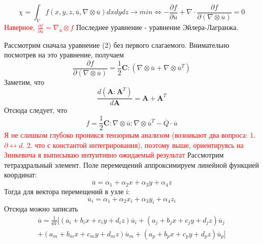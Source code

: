 \documentclass[a4paper,12pt]{article}
\begin{document}
\begin{equation}
\chi = \int_V f(x,y,z,\overline{u}, \nabla \otimes \overline{u})dxdydz  \rightarrow min \Longleftrightarrow -\frac{\partial f}{\partial \overline{u}} + \nabla \cdot \frac{\partial f}{\partial (\nabla \otimes \overline{u} )} = 0
\end{equation}
\textcolor{red}{ Наверное, $\frac{\partial f}{\partial \overline{u}} = \nabla_{\overline{u}} \otimes f$}
Последнее уравнение - уравнение Эйлера-Лагранжа. 
\par
Рассмотрим сначала уравнение (2) без первого слагаемого.
Внимательно посмотрев на это уравнение, получаем
\begin{equation}
    \frac{\partial f}{\partial (\nabla \otimes \overline{u} )} = \frac{1}{2}\textbf{C}:(\nabla \otimes \overline{u} + \nabla \otimes \overline{u}^T)
\end{equation}
Заметим, что
\begin{equation}
    \frac{d (\textbf{A}:\textbf{A}^T)}{d\textbf{A}} = \textbf{A} + \textbf{A}^T
\end{equation}
Отсюда следует, что
\begin{equation}
    f = \frac{1}{2}\textbf{C}:\nabla \otimes \overline{u} : \nabla \otimes \overline{u}^T - \overline{Q}\cdot \overline{u}
\end{equation}
\textcolor{red}{Я не слишком глубоко проникся тензорным анализом (возникают два вопроса: 1. $\partial \leftrightarrow d$. 2. что с константой интегрирования), поэтому выше, ориентируясь на Зинкевича я выписываю интуитивно ожидаемый результат}
Рассмотрим тетраэдральный элемент. Поле перемещений аппроксимируем линейной функцией координат:
\begin{equation}
    \overline{u} = \alpha_1 + \alpha_2 x + \alpha_3 y + \alpha_4 z 
\end{equation}
Тогда для вектора перемещений в узле i:
\begin{equation}
    \overline{u}_i = \alpha_1 + \alpha_2 x_i + \alpha_3 y_i + \alpha_4 z_i
\end{equation}
Отсюда можно записать
\begin{equation}
\begin{split}
    \overline{u} = \frac{1}{6V}[(a_i + b_i x + c_i y + d_i z)\overline{u}_i + (a_j + b_j x + c_j y + d_j z)\overline{u}_j \\  + (a_m + b_m x + c_m y + d_m z)\overline{u}_m  + (a_p + b_p x + c_p y + d_p z)\overline{u}_p]
\end{split}
\end{equation}
\end{document}
